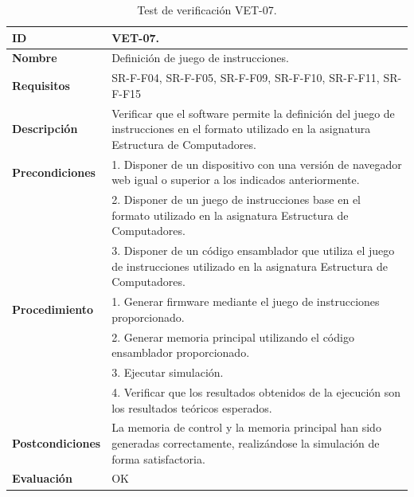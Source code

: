 \begin{center}
\begin{table}[htb]
\centering
\begin{tabular}{@{}p{2.5cm} p{13cm}@{}} 
\toprule
\textbf{ID} 					& VET-07. \\
\midrule
\textbf{Nombre} 				& Definición de juego de instrucciones. \\
\midrule
\textbf{Requisitos} 		& SR-F-F04, SR-F-F05, SR-F-F09, SR-F-F10, SR-F-F11, SR-F-F15\\
\midrule
\textbf{Descripción} 		& Verificar que el software permite la definición del juego de instrucciones en el formato utilizado en la asignatura Estructura de Computadores. \\
\midrule
\textbf{Precondiciones}		& 1. Disponer de un dispositivo con una versión de navegador web igual o superior a los indicados anteriormente. \\
											& 2. Disponer de un juego de instrucciones base en el formato utilizado en la asignatura Estructura de Computadores. \\
											& 3. Disponer de un código ensamblador que utiliza el juego de instrucciones utilizado en la asignatura Estructura de Computadores. \\
\midrule
\textbf{Procedimiento}		& 1. Generar firmware mediante el juego de instrucciones proporcionado.\\
											& 2. Generar memoria principal utilizando el código ensamblador proporcionado.\\
											& 3. Ejecutar simulación.\\
											& 4. Verificar que los resultados obtenidos de la ejecución son los resultados teóricos esperados.\\
\midrule
\textbf{Postcondiciones} 		&  La memoria de control y la memoria principal han sido generadas correctamente, realizándose la simulación de forma satisfactoria.\\
\midrule
\textbf{Evaluación} 			& OK \\
\bottomrule
\end{tabular}
\caption{Test de verificación VET-07.}
\label{tab:vet07}
\end{table}
\end{center}

